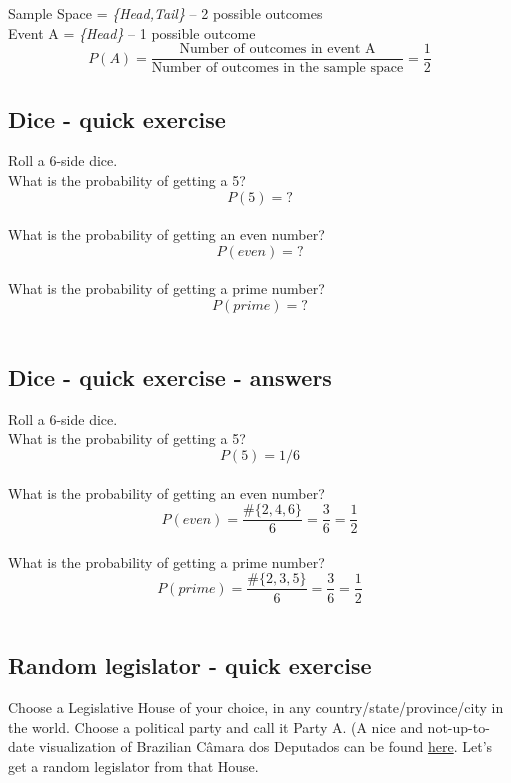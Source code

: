 \documentclass[11pt]{article}
\begin{document}
	Sample Space = \emph{\{Head,Tail\}} -- 2 possible outcomes\\
	
	Event A = \emph{\{Head\}} -- 1 possible outcome\\
	
	\[P(A) = \frac{\text{Number of outcomes in event A}}
	{\text{Number of outcomes in the sample space}} = \frac{1}{2}\]


	\subsection{Dice - quick exercise}
	Roll a 6-side dice.\\
	
	What is the probability of getting a 5?\\
	\[P(5) = ?	\]\\
	
	What is the probability of getting an even number?\\
	\[P(even) = ?	\]\\
	
	What is the probability of getting a prime number?\\
	\[P(prime) = ?	\]\\	


	\subsection{Dice - quick exercise - answers}

	Roll a 6-side dice.\\
	
	What is the probability of getting a 5?\\
	\[P(5) = 1/6	\]\\
	
	What is the probability of getting an even number?\\
	\[P(even) = \frac{\#\{2, 4, 6\}}{6} = \frac{3}{6} = \frac{1}{2}	\]\\
		
	What is the probability of getting a prime number?\\
	\[P(prime) = \frac{\#\{2, 3, 5\}}{6} = \frac{3}{6} = \frac{1}{2}	\]\\	

	\subsection{Random legislator - quick exercise}

	Choose a Legislative House of your choice, in any country/state/province/city in the world. Choose a political party and call it Party A. (A nice and not-up-to-date visualization of Brazilian Câmara dos Deputados can be found \href{http://g1.globo.com/politica/eleicoes/2014/nova-composicao-da-camara.html}{here}. Let's get a random legislator from that House.\\
	
\end{document}
